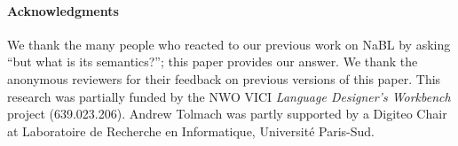 \paragraph{Acknowledgments}

We thank the many people who reacted to our previous work on NaBL by 
asking ``but what is its semantics?''; this paper provides our answer.
We thank the anonymous reviewers for their feedback on previous versions of this
paper.
This research was partially funded by the NWO VICI
\emph{Language Designer's Workbench} project (639.023.206). 
Andrew Tolmach was partly supported by a Digiteo Chair at 
Laboratoire de Recherche en Informatique, Universit\'e Paris-Sud.
